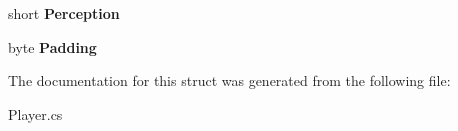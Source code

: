 \begin{DoxyCompactItemize}
\item 
\hypertarget{structffxivlib_1_1_player_1_1_p_l_a_y_e_r_i_n_f_o_afaa389295165211145f21e766cf35ed7}{short {\bfseries Perception}}\label{structffxivlib_1_1_player_1_1_p_l_a_y_e_r_i_n_f_o_afaa389295165211145f21e766cf35ed7}

\item 
\hypertarget{structffxivlib_1_1_player_1_1_p_l_a_y_e_r_i_n_f_o_ac5b81a1932db348b0b8a8a4595b91302}{byte {\bfseries Padding}}\label{structffxivlib_1_1_player_1_1_p_l_a_y_e_r_i_n_f_o_ac5b81a1932db348b0b8a8a4595b91302}

\end{DoxyCompactItemize}


The documentation for this struct was generated from the following file\-:\begin{DoxyCompactItemize}
\item 
Player.\-cs\end{DoxyCompactItemize}
